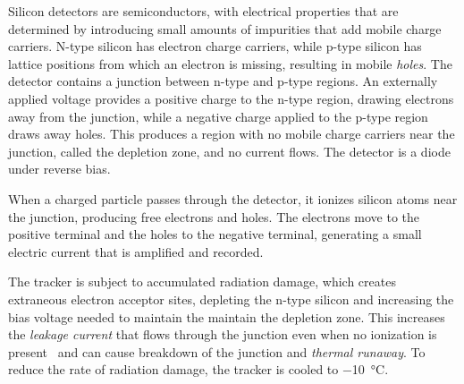 Silicon detectors are semiconductors, with electrical properties that are
determined by introducing small amounts of impurities that add mobile charge
carriers. N-type silicon has electron charge carriers, while p-type silicon has
lattice positions from which an electron is missing, resulting in mobile
\emph{holes}. The detector contains a junction between n-type and p-type
regions. An externally applied voltage provides a positive charge to the n-type
region, drawing electrons away from the junction, while a negative charge
applied to the p-type region draws away holes. This produces a region with no
mobile charge carriers near the junction, called the depletion zone, and no
current flows. The detector is a diode under reverse bias.

When a charged particle passes through the detector, it ionizes silicon atoms
near the junction, producing free electrons and holes. The electrons move to the
positive terminal and the holes to the negative terminal, generating a small
electric current that is amplified and recorded.

The tracker is subject to accumulated radiation damage, which creates extraneous
electron acceptor sites, depleting the n-type silicon and increasing the bias
voltage needed to maintain the maintain the depletion zone. This increases the
\textit{leakage current} that flows through the junction even when no ionization
is present~\cite{ma1989ionizing} and can cause breakdown of the junction and
\textit{thermal runaway}. To reduce the rate of radiation damage, the tracker is
cooled to \SI{-10}{\celsius}.

